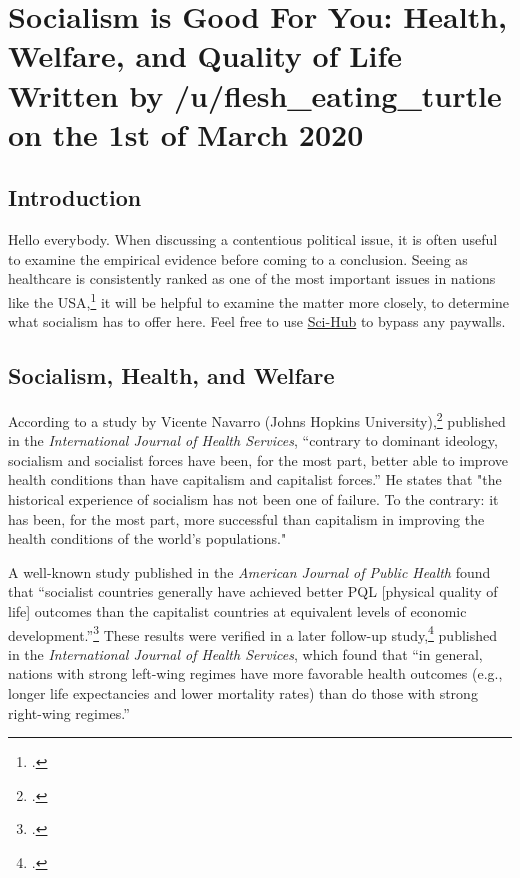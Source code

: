 \section[Socialism is Good For You]{Socialism is Good For You: Health, Welfare, and Quality of Life\\\small{Written by /u/flesh\_eating\_turtle on the 1st of March 2020}}
\subsection*{Introduction}

Hello everybody.
When discussing a contentious political issue, it is often useful to examine the empirical evidence before coming to a conclusion.
Seeing as healthcare is consistently ranked as one of the most important issues in nations like the USA,\footcite{hyrn-issues} it will be helpful to examine the matter more closely, to determine what socialism has to offer here.
Feel free to use \href{https://scihub.bban.top/}{Sci-Hub} to bypass any paywalls.

\subsection*{Socialism, Health, and Welfare}

According to a study by Vicente Navarro (Johns Hopkins University),\footcite{navarro-socialism} published in the \textit{International Journal of Health Services}, ``contrary to dominant ideology, socialism and socialist forces have been, for the most part, better able to improve health conditions than have capitalism and capitalist forces.''
He states that "the historical experience of socialism has not been one of failure.
To the contrary: it has been, for the most part, more successful than capitalism in improving the health conditions of the world's populations."

A well-known study published in the \textit{American Journal of Public Health} found that ``socialist countries generally have achieved better PQL [physical quality of life] outcomes than the capitalist countries at equivalent levels of economic development.''\footcite{cereseto-economic}
These results were verified in a later follow-up study,\footcite{lena-political} published in the \textit{International Journal of Health Services}, which found that ``in general, nations with strong left-wing regimes have more favorable health outcomes (e.g., longer life expectancies and lower mortality rates) than do those with strong right-wing regimes.''

